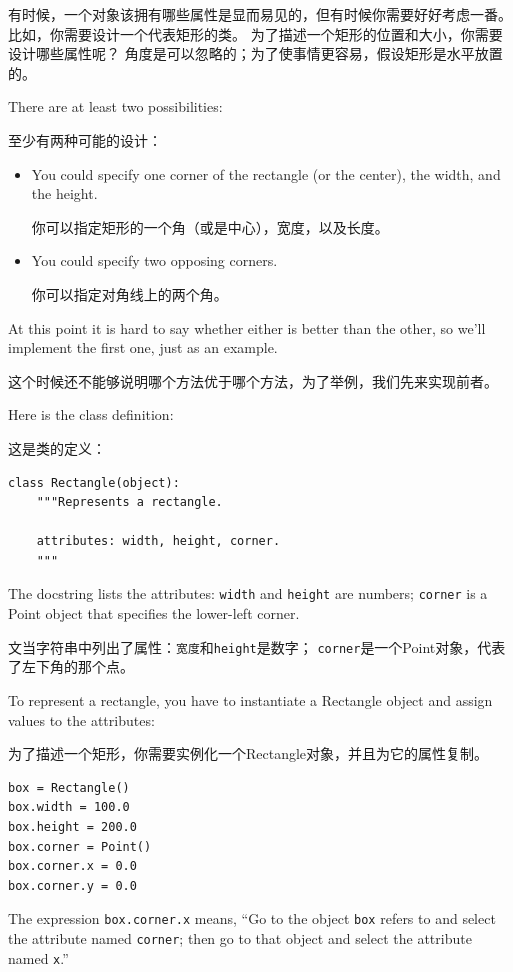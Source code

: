 \documentclass[10pt]{book}
\begin{document}
\begin{CJK}{UTF8}{gbsn}
有时候，一个对象该拥有哪些属性是显而易见的，但有时候你需要好好考虑一番。
比如，你需要设计一个代表矩形的类。
为了描述一个矩形的位置和大小，你需要设计哪些属性呢？
角度是可以忽略的；为了使事情更容易，假设矩形是水平放置的。

There are at least two possibilities: 

至少有两种可能的设计：

\begin{itemize}

\item You could specify one corner of the rectangle
(or the center), the width, and the height.

你可以指定矩形的一个角（或是中心），宽度，以及长度。

\item You could specify two opposing corners.

你可以指定对角线上的两个角。

\end{itemize}

At this point it is hard to say whether either is better than
the other, so we'll implement the first one, just as an example.

这个时候还不能够说明哪个方法优于哪个方法，为了举例，我们先来实现前者。

Here is the class definition:

这是类的定义：

\begin{verbatim}
class Rectangle(object):
    """Represents a rectangle. 

    attributes: width, height, corner.
    """
\end{verbatim}
%
The docstring lists the attributes:  {\tt width} and
{\tt height} are numbers; {\tt corner} is a Point object that
specifies the lower-left corner.

文当字符串中列出了属性：{\tt 宽度}和{\tt height}是数字；
{\tt corner}是一个Point对象，代表了左下角的那个点。

To represent a rectangle, you have to instantiate a Rectangle
object and assign values to the attributes:

为了描述一个矩形，你需要实例化一个Rectangle对象，并且为它的属性复制。

\begin{verbatim}
box = Rectangle()
box.width = 100.0
box.height = 200.0
box.corner = Point()
box.corner.x = 0.0
box.corner.y = 0.0
\end{verbatim}
%
The expression {\tt box.corner.x} means,
``Go to the object {\tt box} refers to and select the attribute named
{\tt corner}; then go to that object and select the attribute named
{\tt x}.''


\end{CJK}
\end{document}

